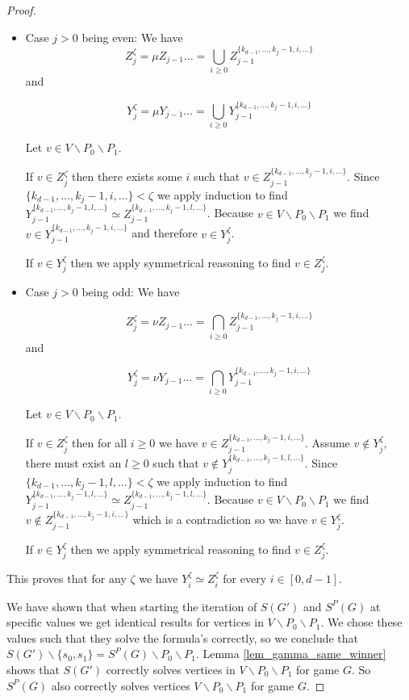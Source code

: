 \begin{theorem}
\begin{proof}
\begin{itemize}
			\item Case $j > 0$ being even: We have 
			\[ Z_j^{\zeta} = \mu Z_{j-1}\dots = \bigcup_{i\geq 0} Z_{j-1}^{\{k_{d-1},\dots,k_j-1,i,\dots\}}\]
			and 
			
			\[ Y_j^{\zeta} = \mu Y_{j-1}\dots = \bigcup_{i\geq 0} Y_{j-1}^{\{k_{d-1},\dots,k_j-1,i,\dots\}}\]
			
			Let $v \in V \backslash P_0 \backslash P_1$.
			
			If $v \in Z_j^{\zeta}$ then there exists some $i$ such that $v \in Z_{j-1}^{\{k_{d-1},\dots,k_j-1,i,\dots\}}$. Since $\{k_{d-1},\dots,k_j-1,i,\dots\} < \zeta$ we apply induction to find $Y_{j-1}^{\{k_{d-1},\dots,k_j-1,l,\dots\}} \simeq Z_{j-1}^{\{k_{d-1},\dots,k_j-1,l,\dots\}}$. Because $v \in V \backslash P_0 \backslash P_1$ we find $v \in Y_{j-1}^{\{k_{d-1},\dots,k_j-1,i,\dots\}}$ and therefore $v \in Y_j^{\zeta}$.
			
			If $v \in Y_j^{\zeta}$ then we apply symmetrical reasoning to find $v \in Z_j^{\zeta}$.
			\item Case $j > 0$ being odd: We have 
			
			\[ Z_j^{\zeta} = \nu Z_{j-1}\dots = \bigcap_{i\geq 0} Z_{j-1}^{\{k_{d-1},\dots,k_j-1,i,\dots\}}\]
			and 
			
			\[ Y_j^{\zeta} = \nu Y_{j-1}\dots = \bigcap_{i\geq 0} Y_{j-1}^{\{k_{d-1},\dots,k_j-1,i,\dots\}}\]
			
			Let $v \in V \backslash P_0 \backslash P_1$.
			
			If $v \in Z_j^{\zeta}$ then for all $i \geq 0$ we have $v \in Z_{j-1}^{\{k_{d-1},\dots,k_j-1,i,\dots\}}$. Assume $v \notin Y_j^{\zeta}$, there must exist an $l \geq 0$ such that $v \notin Y_j^{\{k_{d-1},\dots,k_j-1,l,\dots\}}$. Since $\{k_{d-1},\dots,k_j-1,l,\dots\} < \zeta$ we apply induction to find $Y_{j-1}^{\{k_{d-1},\dots,k_j-1,l,\dots\}} \simeq Z_{j-1}^{\{k_{d-1},\dots,k_j-1,l,\dots\}}$. Because $v \in V \backslash P_0 \backslash P_1$ we find $v \notin Z_{j-1}^{\{k_{d-1},\dots,k_j-1,i,\dots\}}$ which is a contradiction so we have $v \in Y_j^{\zeta}$.
			
			If $v \in Y_j^{\zeta}$ then we apply symmetrical reasoning to find $v \in Z_j^{\zeta}$.
		\end{itemize}
		
		This proves that for any $\zeta$ we have $Y_i^{\zeta} \simeq Z_i^{\zeta}$ for every $i \in [0,d-1]$.
		
		We have shown that when starting the iteration of $S(G')$ and $S^P(G)$ at specific values we get identical results for vertices in $V \backslash P_0 \backslash P_1$. We chose these values such that they solve the formula's correctly, so we conclude that $S(G') \backslash \{s_0,s_1\} = S^P(G) \backslash P_0 \backslash P_1$. Lemma \ref{lem_gamma_same_winner} shows that $S(G')$ correctly solves vertices in $V \backslash P_0 \backslash P_1$ for game $G$. So $S^P(G)$ also correctly solves vertices $V \backslash P_0 \backslash P_1$ for game $G$. 
		

\end{proof}
\end{theorem}

